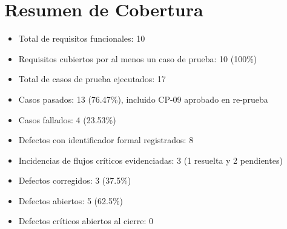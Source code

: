 \section{Resumen de Cobertura}

\begin{itemize}
    \item Total de requisitos funcionales: 10
    \item Requisitos cubiertos por al menos un caso de prueba: 10 (100\%)
    \item Total de casos de prueba ejecutados: 17
    \item Casos pasados: 13 (76.47\%), incluido CP-09 aprobado en re-prueba
    \item Casos fallados: 4 (23.53\%)
    \item Defectos con identificador formal registrados: 8
    \item Incidencias de flujos críticos evidenciadas: 3 (1 resuelta y 2 pendientes)
    \item Defectos corregidos: 3 (37.5\%)
    \item Defectos abiertos: 5 (62.5\%)
    \item Defectos críticos abiertos al cierre: 0
\end{itemize}
